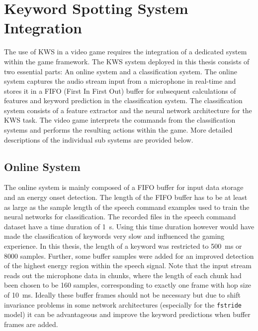 
\section{Keyword Spotting System Integration}
The use of KWS in a video game requires the integration of a dedicated system within the game framework.
The KWS system deployed in this thesis consists of two essential parts: An online system and a classification system.
The online system captures the audio stream input from a microphone in real-time and stores it in a FIFO (First In First Out) buffer for subsequent calculations of features and keyword prediction in the classification system.
The classification system consists of a feature extractor and the neural network architecture for the KWS task.
The video game interprets the commands from the classification systems and performs the resulting actions within the game.
More detailed descriptions of the individual sub systems are provided below.



\subsection{Online System}
The online system is mainly composed of a FIFO buffer for input data storage and an energy onset detection.
The length of the FIFO buffer has to be at least as large as the sample length of the speech command examples used to train the neural networks for classification.
The recorded files in the speech command dataset have a time duration of \SI{1}{\second}. 
Using this time duration however would have made the classification of keywords very slow and influenced the gaming experience.
In this thesis, the length of a keyword was restricted to \SI{500}{\milli\second} or 8000 samples.
Further, some buffer samples were added for an improved detection of the highest energy region within the speech signal.
Note that the input stream reads out the microphone data in chunks, where the length of each chunk had been chosen to be 160 samples, corresponding to exactly one frame with hop size of \SI{10}{\milli\second}.
Ideally these buffer frames should not be necessary but due to shift invariance problems in some network architectures (especially for the \texttt{fstride} model) it can be advantageous and improve the keyword predictions when buffer frames are added.

